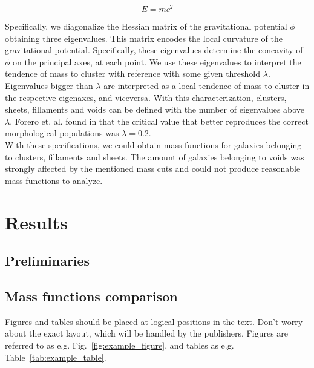 \documentclass[a4paper,fleqn,usenatbib]{mnras}
\begin{document}
\begin{equation}
E =  mc^2
\label{eq:hessian}
\end{equation}

Specifically, we diagonalize the Hessian matrix of the gravitational potential $\phi$ obtaining three eigenvalues. 
This matrix encodes the local curvature of the gravitational potential. 
Specifically, these eigenvalues determine the concavity of $\phi$ on the principal axes, at each point. 
We use these eigenvalues to interpret the tendence of mass to cluster with reference with some given threshold $\lambda$. 
Eigenvalues bigger than $\lambda$ are interpreted as a local tendence of mass to cluster in the respective eigenaxes, and viceversa. 
With this characterization, clusters, sheets, fillaments and voids can be defined with the number of eigenvalues above $\lambda$.
Forero et. al. found in \cite{Forero2009} that the critical value that better reproduces the correct morphological populations was $\lambda = 0.2$. \\

With these specifications, we could obtain mass functions for galaxies belonging to clusters, fillaments and sheets. The amount of galaxies belonging to voids was strongly affected by the mentioned mass cuts and could not produce reasonable mass functions to analyze.

\section{Results}
\subsection{Preliminaries}

\subsection{Mass functions comparison}

Figures and tables should be placed at logical positions in the text. Don't
worry about the exact layout, which will be handled by the publishers.
Figures are referred to as e.g. Fig.~\ref{fig:example_figure}, and tables as
e.g. Table~\ref{tab:example_table}.
\end{document}
